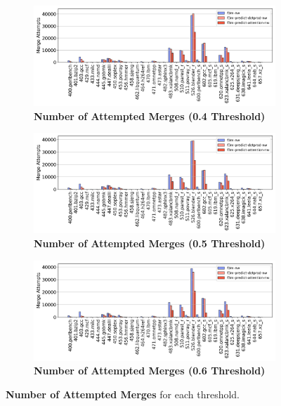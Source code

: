 \begin{figure}[p!]
    \centering
    \begin{subfigure}{\textwidth}
        \centering
        \includegraphics[scale=0.47]{Figures/Valid_Merging_Predictions/0.4_MergeAttempts.png}
        \caption{\textbf{Number of Attempted Merges (\textbf{0.4} Threshold)}} 
        \label{fig:0.4AttemptedMerges}
    \end{subfigure}
    \begin{subfigure}{\textwidth}
        \centering
        \includegraphics[scale=0.47]{Figures/Valid_Merging_Predictions/0.5_MergeAttempts.png}
        \caption{\textbf{Number of Attempted Merges (\textbf{0.5} Threshold)}} 
        \label{fig:0.5AttemptedMerges}
    \end{subfigure}
    \begin{subfigure}{\textwidth}
    \centering
        \includegraphics[scale=0.47]{Figures/Valid_Merging_Predictions/0.6_MergeAttempts.png}
        \caption{\textbf{Number of Attempted Merges (\textbf{0.6} Threshold)}} 
        \label{fig:0.6AttemptedMerges}
    \end{subfigure}

    \caption{\textbf{Number of Attempted Merges} for each threshold.} 
    \label{fig:AttemptedMerges}
\end{figure}

